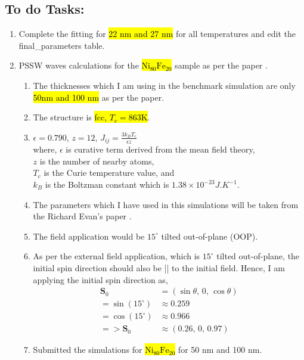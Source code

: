 \subsection*{To do Tasks:}
\begin{enumerate}
    \item Complete the fitting for \hl{22 nm and 27 nm} for all temperatures and edit the final\_parameters table. \cmark 
    \item  PSSW waves calculations for the \hl{$\mathrm{Ni_{80}Fe_{20}}$} sample as per the paper \cite{pandaUltrafastDemagnetizationPrecession2023}.
    \begin{enumerate}[\ding{212}]
        \item The thicknesses which I am using in the benchmark simulation are only \hl{50nm and 100 nm} as per the paper.
        \item The structure is \hl{fcc, $T_c=863$K}.
        \item $\epsilon=0.790$, $z=12$, $J_{ij}=\frac{3k_BT_c}{\epsilon z}$ \\ where, $\epsilon$ is curative term derived from the mean field theory,\\ $z$ is the number of nearby atoms, \\ $T_c$ is the Curie temperature value, and \\ $k_B$ is the Boltzman constant which is $1.38\times10^{-23} J.K^{-1}$.
        \item The parameters which I have used in this simulations will be taken from the Richard Evan's paper \cite{evansAtomisticSpinModel2014}.
        \item The field application would be $15^\circ$ tilted out-of-plane (OOP).
        \item As per the external field application, which is $15^\circ$ tilted out-of-plane, the initial spin direction should also be || to the initial field. Hence, I am applying the initial spin direction as, 
        \[
        \begin{aligned}
            \mathbf{S}_0 &= (\sin\theta,\,0,\,\cos\theta) \\
            =\sin(15^\circ) &\approx 0.259 \\
            =\cos(15^\circ) &\approx 0.966 \\
            =>\mathbf{S}_0 &\approx (0.26,\,0,\,0.97)
        \end{aligned}
        \]  
        \item Submitted the simulations for \hl{$\mathrm{Ni_{80}Fe_{20}}$} for 50 nm and 100 nm.
    \end{enumerate}
\end{enumerate}
